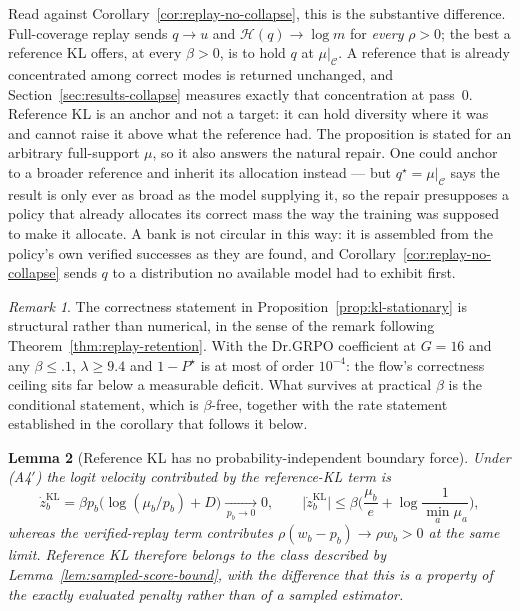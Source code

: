 \documentclass{article}
\newcommand{\1}{\mathbf 1}
\newtheorem{lemma}{Lemma}[section]
\theoremstyle{remark}
\newtheorem{remark}[lemma]{Remark}
\theoremstyle{definition}
\theoremstyle{plain}
\begin{document}
Read against Corollary~\ref{cor:replay-no-collapse}, this is the substantive
difference. Full-coverage replay sends $q\to u$ and
$\mathcal H(q)\to\log m$ for \emph{every} $\rho>0$; the best a reference KL
offers, at every $\beta>0$, is to hold $q$ at $\mu|_{\mathcal C}$. A reference that is already
concentrated among correct modes is returned unchanged, and
Section~\ref{sec:results-collapse} measures exactly that concentration at pass~0.
Reference KL is an anchor and not a target: it can hold diversity where it was
and cannot raise it above what the reference had. The proposition is stated for
an arbitrary full-support $\mu$, so it also answers the natural repair. One
could anchor to a broader reference and inherit its allocation instead --- but
$q^\star=\mu|_{\mathcal C}$ says the result is only ever as broad as the model
supplying it, so the repair presupposes a policy that already allocates its
correct mass the way the training was supposed to make it allocate. A bank is
not circular in this way: it is assembled from the policy's own verified
successes as they are found, and Corollary~\ref{cor:replay-no-collapse} sends
$q$ to a distribution no available model had to exhibit first.

\begin{remark}
The correctness statement in Proposition~\ref{prop:kl-stationary} is structural
rather than numerical, in the sense of the remark following
Theorem~\ref{thm:replay-retention}. With the Dr.GRPO coefficient at $G=16$ and
any $\beta\le.1$, $\lambda\ge9.4$ and $1-P^\star$ is at most of order
$10^{-4}$: the flow's correctness ceiling sits far below a measurable deficit.
What survives at practical $\beta$ is the conditional statement, which is
$\beta$-free, together with the rate statement established in the corollary
that follows it below.
\end{remark}

\begin{lemma}[Reference KL has no probability-independent boundary force]
\label{lem:kl-boundary-force}
Under (A4$'$) the logit velocity contributed by the reference-KL term is
\[
  \dot z^{\mathrm{KL}}_b=\beta p_b\big(\log(\mu_b/p_b)+D\big)
  \xrightarrow[\,p_b\to0\,]{}0,
  \qquad
  \big|\dot z^{\mathrm{KL}}_b\big|
  \le\beta\Big(\frac{\mu_b}{e}+\log\frac1{\min_a\mu_a}\Big),
\]
whereas the verified-replay term contributes $\rho(w_b-p_b)\to\rho w_b>0$ at
the same limit. Reference KL therefore belongs to the class described by
Lemma~\ref{lem:sampled-score-bound}, with the difference that this is a
property of the exactly evaluated penalty rather than of a sampled estimator.
\end{lemma}
\end{document}
